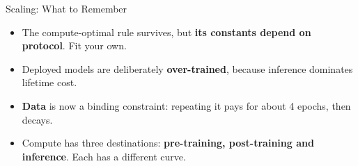 \begin{frame}{Scaling: What to Remember}
    \begin{itemize}\itemsep0.6em
        \item The compute-optimal rule survives, but \textbf{its constants depend on protocol}. Fit your own.
        \item Deployed models are deliberately \textbf{over-trained}, because inference dominates lifetime cost.
        \item \textbf{Data} is now a binding constraint: repeating it pays for about 4 epochs, then decays.
        \item Compute has three destinations: \textbf{pre-training, post-training and inference}. Each has a different curve.
    \end{itemize}
    \vspace{0.3em}
    \vspace{0.3em}
\end{frame}
